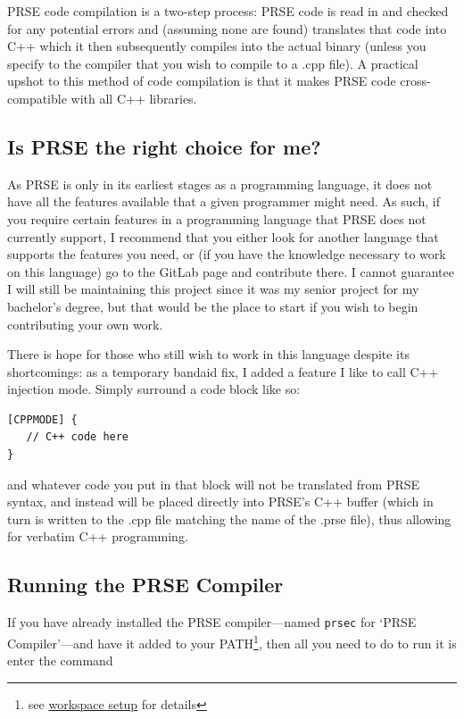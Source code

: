 \documentclass[letterpaper, 12pt]{article}
\begin{document}
PRSE code compilation is a two-step process: PRSE code is read in and checked for any potential
errors and (assuming none are found) translates that code into C++ which it then subsequently
compiles into the actual binary (unless you specify to the compiler that you wish to compile to a
.cpp file). A practical upshot to this method of code compilation is that it makes PRSE code
cross-compatible with all C++ libraries.

\subsection{Is PRSE the right choice for me?}
As PRSE is only in its earliest stages as a programming language, it does not have all the features
available that a given programmer might need. As such, if you require certain features in a
programming language that PRSE does not currently support, I recommend that you either look for
another language that supports the features you need, or (if you have the knowledge necessary to
work on this language) go to the GitLab page %
and contribute there. I cannot guarantee I will still be maintaining this project since it was my
senior project for my bachelor's degree, but that would be the place to start if you wish to begin
contributing your own work.\linebreak

There is hope for those who still wish to work in this language despite its shortcomings: as a
temporary bandaid fix, I added a feature I like to call C++ injection mode. Simply surround a code
block like so:

\begin{lstlisting}
[CPPMODE] {
   // C++ code here
}
\end{lstlisting}

and whatever code you put in that block will not be translated from PRSE syntax, and instead will be
placed directly into PRSE's C++ buffer (which in turn is written to the .cpp file matching the name
of the .prse file), thus allowing for verbatim C++ programming.

\subsection{Running the PRSE Compiler}

If you have already installed the PRSE compiler---named \texttt{prsec} for `PRSE Compiler'---and
have it added to your PATH\footnote{see \hyperref[sec:prse-workspace-setup]{workspace setup} for
details}, then all you need to do to run it is enter the command\linebreak
\end{document}
